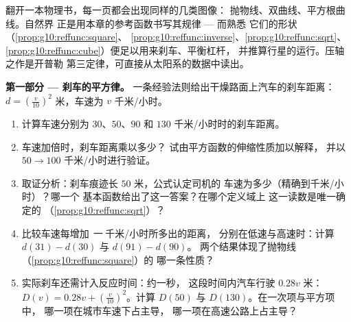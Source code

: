 \begin{problem}
\label{pb:g10:reffunc:1}
翻开一本物理书，每一页都会出现同样的几类图像：
抛物线、双曲线、平方根曲线。自然界
正是用本章的参考函数书写其规律 --- 而熟悉
它们的形状（\cref{prop:g10:reffunc:square}、
\cref{prop:g10:reffunc:inverse}、\cref{prop:g10:reffunc:sqrt}、
\cref{prop:g10:reffunc:cube}）便足以用来刹车、平衡杠杆，
并推算行星的运行。压轴之作是开普勒
第三定律，可直接从太阳系的数据中读出。

\medskip
\noindent\textbf{第一部分 --- 刹车的平方律。}
一条经验法则给出干燥路面上汽车的刹车距离：
$d = \left(\frac{v}{10}\right)^{2}$ 米，车速为 $v$ 千米/小时。
\begin{enumerate}
  \item 计算车速分别为 $30$、$50$、$90$ 和
        $130$ 千米/小时时的刹车距离。
  \item 车速加倍时，刹车距离乘以多少？
        试由平方函数的伸缩性质加以解释，
        并以 $50 \to 100$ 千米/小时进行验证。
  \item 取证分析：刹车痕迹长 $50$ 米，公式认定司机的
        车速为多少（精确到千米/小时）？哪一个
        基本函数给出了这一答案？在哪个定义域上
        这一读数是唯一确定的
        （\cref{prop:g10:reffunc:sqrt}）？
  \item 比较车速每增加 \emph{一} 千米/小时所多出的距离，
        分别在低速与高速时：计算
        $d(31) - d(30)$ 与 $d(91) - d(90)$。
        两个结果体现了抛物线（\cref{prop:g10:reffunc:square}）的
        哪一条性质？
  \item 实际刹车还需计入反应时间：约一秒，
        这段时间内汽车行驶 $0.28v$ 米：
        $D(v) = 0.28v + \left(\frac{v}{10}\right)^2$。计算
        $D(50)$ 与 $D(130)$。在一次项与平方项中，
        哪一项在城市车速下占主导，
        哪一项在高速公路上占主导？
\end{enumerate}


\end{problem}

